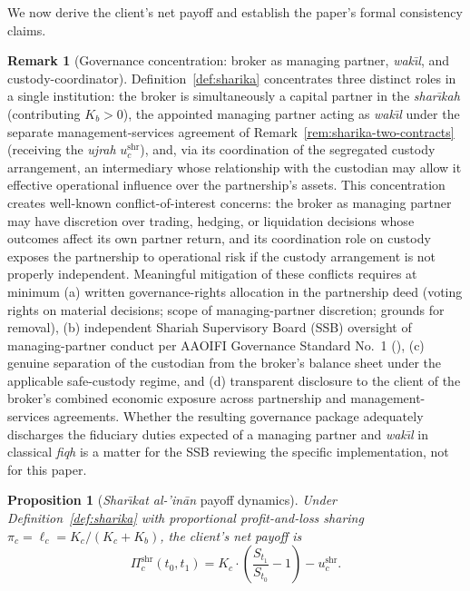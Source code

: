 \documentclass[preprint,12pt,authoryear]{elsarticle}
\newtheorem{proposition}{Proposition}[section]
\theoremstyle{definition}
\newtheorem{remark}{Remark}[section]
\begin{document}
We now derive the client's net payoff and establish the paper's
formal consistency claims.

\begin{remark}[Governance concentration: broker as managing
    partner, \emph{wak\={\i}l}, and custody-coordinator]
\label{rem:sharika-governance}
Definition~\ref{def:sharika} concentrates three distinct roles in a
single institution: the broker is simultaneously a capital partner
in the \emph{shar\={\i}kah} (contributing $K_b > 0$), the appointed
managing partner acting as \emph{wak\={\i}l} under the separate
management-services agreement of
Remark~\ref{rem:sharika-two-contracts} (receiving the \emph{ujrah}
$u^{\text{shr}}_c$), and, via its coordination of the segregated
custody arrangement, an intermediary whose relationship with the
custodian may allow it effective operational influence over the
partnership's assets. This concentration creates well-known
conflict-of-interest concerns: the broker as managing partner may
have discretion over trading, hedging, or liquidation decisions
whose outcomes affect its own partner return, and its coordination
role on custody exposes the partnership to operational risk if the
custody arrangement is not properly independent. Meaningful
mitigation of these conflicts requires at minimum (a) written
governance-rights allocation in the partnership deed (voting rights
on material decisions; scope of managing-partner discretion;
grounds for removal), (b) independent Shariah Supervisory Board
(SSB) oversight of managing-partner conduct per AAOIFI Governance
Standard No.~1 (\citealp{AAOIFI-GS1}), (c) genuine separation of
the custodian from the broker's balance sheet under the applicable
safe-custody regime, and (d) transparent disclosure to the client
of the broker's combined economic exposure across partnership and
management-services agreements. Whether the resulting governance
package adequately discharges the fiduciary duties expected of a
managing partner and \emph{wak\={\i}l} in classical \emph{fiqh} is
a matter for the SSB reviewing the specific implementation, not
for this paper.
\end{remark}

\begin{proposition}[\emph{Shar\={\i}kat al-'in\={a}n} payoff
    dynamics]
\label{prop:sharika-payoff}
Under Definition~\ref{def:sharika} with proportional
profit-and-loss sharing $\pi_c = \ell_c = K_c / (K_c + K_b)$, the
client's net payoff is
\begin{equation}
    \Pi^{\text{shr}}_c(t_0, t_1)
    = K_c \cdot \left( \frac{S_{t_1}}{S_{t_0}} - 1 \right)
      - u^{\text{shr}}_c.
    \label{eq:sharika-payoff}
\end{equation}
\end{proposition}
\end{document}
